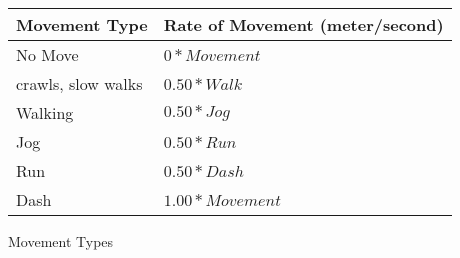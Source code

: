 \begin{SHTable}
	\begin{tabular}{ll}
	Movement Type		& Rate of Movement (meter/second) \\ 
\hline
	No Move             & \( 0 * Movement \) \\
	crawls, slow walks 	& \( 0.50 * Walk  \) \\
	Walking             & \( 0.50 * Jog   \) \\
	Jog					& \( 0.50 * Run   \) \\
	Run                 & \( 0.50 * Dash  \) \\
	Dash                & \( 1.00 * Movement \) \\ \hline
	\end{tabular}
    \caption{Movement Types}
\end{SHTable}

